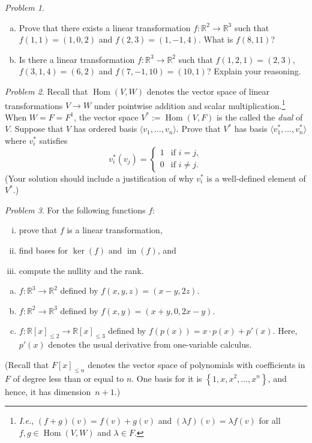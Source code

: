 \documentclass[11pt,twoside]{amsart}
\theoremstyle{plain}
\theoremstyle{remark}
\newtheorem{prob}{Problem}
\theoremstyle{definition}
\theoremstyle{definition}
\newcommand{\RR}{\mathbb{R}}
\newcommand{\R}{\mathbb{R}}
\newcommand{\Hom}{\operatorname{Hom}}
\newcommand{\im}{\operatorname{im}}
\begin{document}
\begin{prob}
\begin{enumerate}[(a)]
     \item Prove that there exists a linear transformation $f\colon \R^2 \to \R^3$ such that $f(1,1)=(1,0,2)$ and $f(2,3)=(1,-1,4)$. What is $f(8,11)$?
     \item Is there a linear transformation $f\colon \R^3 \to \R^2$ such that $f(1,2,1)=(2,3)$, $f(3,1,4)=(6,2)$ and $f(7,-1,10)=(10,1)$? Explain your reasoning.
    \end{enumerate}
\end{prob}

\begin{prob}
Recall that $\Hom(V,W)$ denotes the vector space of linear transformations $V\to W$ under pointwise addition and scalar multiplication.\footnote{\emph{I.e.}, $(f+g)(v) = f(v)+g(v)$ and $(\lambda f)(v) = \lambda f(v)$ for all $f,g\in \Hom(V,W)$ and $\lambda\in F$.} When $W = F = F^1$, the vector space $V^* := \Hom(V,F)$ is the called the \emph{dual} of $V$. Suppose that $V$ has ordered basis $\langle v_1,\ldots,v_n\rangle$. Prove that $V^*$ has basis $\langle v_1^*,\ldots,v_n^*\rangle$ where $v_i^*$ satisfies
\[
  v_i^*(v_j) =
  \begin{cases}
    1&\text{if }i=j,\\
    0&\text{if }i\ne j.
  \end{cases}
\]
(Your solution should include a justification of why $v_i^*$ is a well-defined element of $V^*$.)
\end{prob}

\begin{prob}
For the following functions $f$:
   \begin{enumerate}[(i)]
    \item prove that $f$ is a linear transformation,
    \item find bases for $\ker(f)$ and $\im(f)$, and
    \item compute the nullity and the rank.
   \end{enumerate}
   \begin{enumerate}[(a)]
    \item $f\colon \R^3 \to \R^2$ defined by $f(x,y,z)=(x-y,2z)$. 
    \item $f \colon \R^2 \to \R^3$ defined by $f(x,y)=(x+y, 0, 2x-y)$. 
    \item $f\colon \RR[x]_{\le 2} \to \RR[x]_{\le 3}$ defined by $f(p(x))=x\cdot p(x)+p'(x)$.
  Here, $p'(x)$ denotes the usual derivative from one-variable calculus.
   \end{enumerate}
    (Recall that $F[x]_{\le n}$ denotes the vector space of polynomials with
    coefficients in $F$ of degree less than or equal to $n$.  One basis for it is
  $\left\{ 1,x,x^2,\dots,x^n \right\}$, and hence, it has dimension~$n+1$.)
\end{prob}
\end{document}
